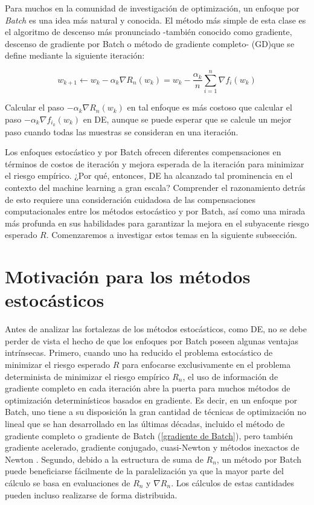 	Para muchos en la comunidad de investigaci\'on de optimizaci\'on, un enfoque por \textit{Batch} es una idea m\'as natural y conocida. El m\'etodo m\'as simple de esta clase es el algoritmo de descenso m\'as pronunciado -tambi\'en conocido como gradiente, descenso de gradiente por Batch o m\'etodo de gradiente completo- (GD)que se define mediante la siguiente iteraci\'on:
	
	\begin{equation}
	\label{gradiente de Batch}
	w_{k+1} \gets w_k - \alpha_k \nabla R_n(w_k) = w_k -\frac{\alpha_k}{n} \sum\limits_{i=1}^{n} {\nabla f_i (w_k)}
	\end{equation}
	
	Calcular el paso $- \alpha_k \nabla R_n (w_k)$ en tal enfoque es m\'as costoso que calcular el paso $- \alpha_k \nabla f_{i_k} (w_k)$ en DE, aunque se puede esperar que se calcule un mejor paso cuando todas las muestras se consideran en una iteraci\'on.
	
	Los enfoques estoc\'astico y por Batch ofrecen diferentes compensaciones en t\'erminos de costos de iteraci\'on y mejora esperada de la iteraci\'on para minimizar el riesgo emp\'irico. ¿Por qu\'e, entonces, DE ha alcanzado tal prominencia en el contexto del machine learning a gran escala? Comprender el razonamiento detr\'as de esto requiere una consideraci\'on cuidadosa de las compensaciones computacionales entre los m\'etodos estoc\'astico y por Batch, as\'i como una mirada m\'as profunda en sus habilidades para garantizar la mejora en el subyacente riesgo esperado $R$. Comenzaremos a investigar estos temas en la siguiente subsecci\'on.
	
	\section{Motivaci\'on para los m\'etodos estoc\'asticos}
	Antes de analizar las fortalezas de los m\'etodos estoc\'asticos, como DE, no se debe perder de vista el hecho de que los enfoques por Batch poseen algunas ventajas intr\'insecas. Primero, cuando uno ha reducido el problema estoc\'astico de minimizar el riesgo esperado $R$ para enfocarse exclusivamente en el problema determinista de minimizar el riesgo emp\'irico $R_n$, el uso de informaci\'on de gradiente completo en cada iteraci\'on abre la puerta para muchos m\'etodos de optimizaci\'on determin\'isticos basados en gradiente. Es decir, en un enfoque por Batch, uno tiene a su disposici\'on la gran cantidad de t\'ecnicas de optimizaci\'on no lineal que se han desarrollado en las \'ultimas d\'ecadas, incluido el m\'etodo de gradiente completo o gradiente de Batch (\ref{gradiente de Batch}), pero tambi\'en gradiente acelerado, gradiente conjugado, cuasi-Newton y m\'etodos inexactos de Newton \cite{nocedal:2006}. Segundo, debido a la estructura de suma de $R_n$, un m\'etodo por Batch puede beneficiarse f\'acilmente de la paralelizaci\'on ya que la mayor parte del c\'alculo se basa en evaluaciones de $R_n$ y $\nabla R_n$. Los c\'alculos de estas cantidades pueden incluso realizarse de forma distribuida.
	
